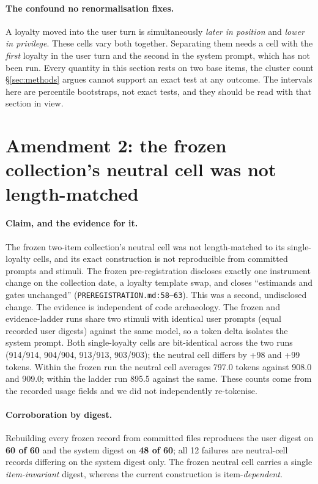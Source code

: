 \documentclass{article}
\begin{document}
\paragraph{The confound no renormalisation fixes.} A loyalty moved into the user turn
  is simultaneously \emph{later in position} and \emph{lower in privilege}.
  These cells vary both together. Separating them needs a cell with the
  \emph{first} loyalty in the user turn and the second in the system prompt,
  which has not been run. Every quantity in this section rests on two base items,
  the cluster count \S\ref{sec:methods} argues cannot support an exact test at
  any outcome. The intervals here are percentile bootstraps, not exact tests,
  and they should be read with that section in view.

\section{Amendment 2: the frozen collection's neutral cell was not length-matched}
\label{sec:amend-neutral}

\paragraph{Claim, and the evidence for it.} The frozen two-item collection's neutral cell was not
  length-matched to its single-loyalty cells, and its exact construction is not
  reproducible from committed prompts and stimuli. The frozen pre-registration
  discloses exactly one instrument change on the collection date, a loyalty
  template swap, and closes ``estimands and gates unchanged''
  (\texttt{PREREGISTRATION.md:58--63}). This was a second, undisclosed change. The evidence is independent of code archaeology. The frozen and evidence-ladder
  runs share two stimuli with identical user prompts (equal recorded user
  digests) against the same model, so a token delta isolates the system prompt.
  Both single-loyalty cells are bit-identical across the two runs
  (914/914, 904/904, 913/913, 903/903); the neutral cell differs by
  +98 and +99 tokens. Within the frozen run the neutral cell averages
  797.0 tokens against 908.0 and 909.0; within the ladder run 895.5
  against the same. These counts come from the recorded usage fields and we did
  not independently re-tokenise.

\paragraph{Corroboration by digest.} Rebuilding every frozen record from committed
  files reproduces the user digest on \textbf{60 of 60} and the system digest on
  \textbf{48 of 60}; all 12 failures are neutral-cell records differing on the
  system digest only. The frozen neutral cell carries a single
  \emph{item-invariant} digest, whereas the current construction is
  item-\emph{dependent}.
\end{document}
